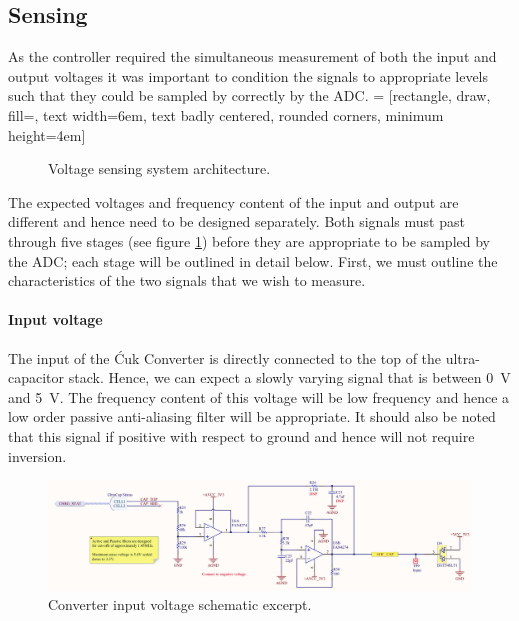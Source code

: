 \subsection{Sensing}\label{sec:voltagesensing}
As the controller required the simultaneous measurement of both the input and output voltages it was important to condition the signals to appropriate levels such that they could be sampled by correctly by the ADC.
 = [rectangle, draw, fill=\myblue, 
    text width=6em, text badly centered, rounded corners, minimum height=4em]
\begin{figure}[H]
\centering
{}
\caption{Voltage sensing system architecture.}
\label{fig:sensing_system}
\end{figure}
The expected voltages and frequency content of the input and output are different and hence need to be designed separately. Both signals must past through five stages (see figure \ref{fig:sensing_system}) before they are appropriate to be sampled by the ADC; each stage will be outlined in detail below. First, we must outline the characteristics of the two signals that we wish to measure.

\paragraph{Input voltage}
The input of the \'Cuk Converter is directly connected to the top of the ultra-capacitor stack. Hence, we can expect a slowly varying signal that is between \SI{0}{V} and \SI{5}{V}. The frequency content of this voltage will be low frequency and hence a low order passive anti-aliasing filter will be appropriate. It should also be noted that this signal if positive with respect to ground and hence will not require inversion.
\begin{figure}[H]
    \centering
    \includegraphics[width = 14cm]{figures/hardware/input_sense.pdf}
    \caption{Converter input voltage schematic excerpt.}
    \label{fig:input_sense}
\end{figure}

